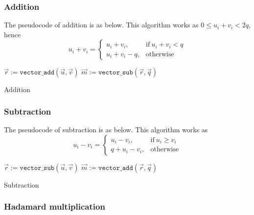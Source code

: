 \documentclass[oneside,9pt]{article}
\begin{document}
\subsubsection{Addition}

The pseudocode of addition is as below. This algorithm works as $0 \leq u_i + v_i < 2q$, hence
\begin{equation}
u_i + v_i = 
\begin{cases}
	u_i + v_i, & \text{if}\ u_i + v_i < q \\
	u_i + v_i - q, & \text{otherwise}
\end{cases}
\end{equation}

\begin{algorithm}[]
 $\vec{r} := \texttt{vector\_add}(\vec{u}, \vec{v})$\;
 $\vec{m} := \texttt{vector\_sub}(\vec{r}, \vec{q})$\;
 \caption{Addition}
\end{algorithm}

\subsubsection{Subtraction}
The pseudocode of subtraction is as below. This algorithm works as 
\begin{equation}
u_i - v_i = 
\begin{cases}
	u_i - v_i, & \text{if}\ u_i \geq v_i \\
	q + u_i - v_i, & \text{otherwise}
\end{cases}
\end{equation}

\begin{algorithm}[]
 $\vec{r} := \texttt{vector\_sub}(\vec{u}, \vec{v})$\;
 $\vec{m} := \texttt{vector\_add}(\vec{r}, \vec{q})$\;
 \caption{Subtraction}
\end{algorithm}

\subsubsection{Hadamard multiplication}
\end{document}
